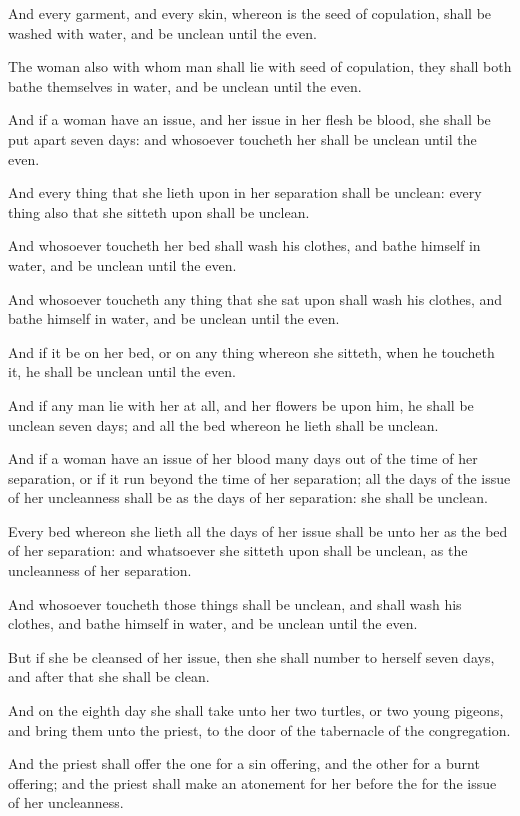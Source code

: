 \verse And every garment, and every skin, whereon is the seed of copulation, shall be washed with water, and be unclean until the even.

\verse The woman also with whom man shall lie with seed of copulation, they shall both bathe themselves in water, and be unclean until the even.

\verse And if a woman have an issue, and her issue in her flesh be blood, she shall be put apart seven days: and whosoever toucheth her shall be unclean until the even.

\verse And every thing that she lieth upon in her separation shall be unclean: every thing also that she sitteth upon shall be unclean.

\verse And whosoever toucheth her bed shall wash his clothes, and bathe himself in water, and be unclean until the even.

\verse And whosoever toucheth any thing that she sat upon shall wash his clothes, and bathe himself in water, and be unclean until the even.

\verse And if it be on her bed, or on any thing whereon she sitteth, when he toucheth it, he shall be unclean until the even.

\verse And if any man lie with her at all, and her flowers be upon him, he shall be unclean seven days; and all the bed whereon he lieth shall be unclean.

\verse And if a woman have an issue of her blood many days out of the time of her separation, or if it run beyond the time of her separation; all the days of the issue of her uncleanness shall be as the days of her separation: she shall be unclean.

\verse Every bed whereon she lieth all the days of her issue shall be unto her as the bed of her separation: and whatsoever she sitteth upon shall be unclean, as the uncleanness of her separation.

\verse And whosoever toucheth those things shall be unclean, and shall wash his clothes, and bathe himself in water, and be unclean until the even.

\verse But if she be cleansed of her issue, then she shall number to herself seven days, and after that she shall be clean.

\verse And on the eighth day she shall take unto her two turtles, or two young pigeons, and bring them unto the priest, to the door of the tabernacle of the congregation.

\verse And the priest shall offer the one for a sin offering, and the other for a burnt offering; and the priest shall make an atonement for her before the \LORD for the issue of her uncleanness.


